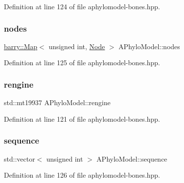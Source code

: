 Definition at line 124 of file aphylomodel-\/bones.\+hpp.

\mbox{\label{class_a_phylo_model_af48d7223972ea6f74d2780b316db730e}} 
\subsubsection{\texorpdfstring{nodes}{nodes}}
{\footnotesize\ttfamily \hyperlink{namespacebarry_a979a04835a9855ff2054c383c569c89e}{barry\+::\+Map}$<$ unsigned int, \hyperlink{class_node}{Node} $>$ A\+Phylo\+Model\+::nodes}



Definition at line 125 of file aphylomodel-\/bones.\+hpp.

\mbox{\label{class_a_phylo_model_a3f7a406330ca376840dcea3324e69448}} 
\subsubsection{\texorpdfstring{rengine}{rengine}}
{\footnotesize\ttfamily std\+::mt19937 A\+Phylo\+Model\+::rengine}



Definition at line 121 of file aphylomodel-\/bones.\+hpp.

\mbox{\label{class_a_phylo_model_a5f15ec301385244387c9be5290f5ee28}} 
\subsubsection{\texorpdfstring{sequence}{sequence}}
{\footnotesize\ttfamily std\+::vector$<$ unsigned int $>$ A\+Phylo\+Model\+::sequence}



Definition at line 126 of file aphylomodel-\/bones.\+hpp.

\mbox{\label{class_a_phylo_model_aa6a0a51491c065588bb3504d9b84540c}} 

